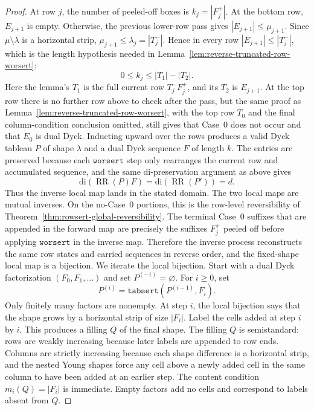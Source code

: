 \documentclass[11pt]{article}
\theoremstyle{plain}
\theoremstyle{definition}
\theoremstyle{remark}
\newcommand{\di}{\mathrm{di}}
\newcommand{\worsert}{\texttt{worsert}}
\begin{document}
\begin{proof}
At row \(j\), the number of peeled-off boxes is \(k_j=|F_j^+|\).  At the bottom
row, \(E_{j+1}\) is empty.  Otherwise, the previous lower-row pass gives
\(|E_{j+1}|\le \mu_{j+1}\).  Since \(\mu\setminus\lambda\) is a horizontal
strip, \(\mu_{j+1}\le \lambda_j=|T_j^-|\).  Hence in every row
\(|E_{j+1}|\le |T_j^-|\), which is the length hypothesis needed in
Lemma~\ref{lem:reverse-truncated-row-worsert}:
\[
  0\le k_j\le |T_1|-|T_2|.
\]
Here the lemma's \(T_1\) is the full current row \(T_j^-F_j^+\), and its
\(T_2\) is \(E_{j+1}\).  At the top row there is no further row above to check
after the pass, but the same proof as
Lemma~\ref{lem:reverse-truncated-row-worsert}, with the top row \(T_0\) and the
final column-condition conclusion omitted, still gives that Case~0 does not
occur and that \(E_0\) is dual Dyck.
Inducting upward over the rows produces a valid Dyck tableau \(P\) of shape
\(\lambda\) and a dual Dyck sequence \(F\) of length \(k\).  The entries are
preserved because each \(\worsert\) step only rearranges the current row and
accumulated sequence, and the same \(\di\)-preservation argument as above gives
\[
  \di(\operatorname{RR}(P)F)=\di(\operatorname{RR}(P'))=d.
\]
Thus the inverse local map lands in the stated domain.
The two local maps are mutual inverses.  On the no-Case~0 portions, this is the
row-level reversibility of Theorem~\ref{thm:rowsert-global-reversibility}.  The
terminal Case~0 suffixes
that are appended in the forward map are precisely the suffixes \(F_j^+\) peeled
off before applying \(\worsert\) in the inverse map.  Therefore the inverse
process reconstructs the same row states and carried sequences in reverse
order, and the fixed-shape local map is a bijection.
We iterate the local bijection.  Start with a dual Dyck factorization
\((F_0,F_1,\ldots)\) and set \(P^{(-1)}=\varnothing\).  For \(i\ge 0\), set
\[
  P^{(i)}=\texttt{tabsert}(P^{(i-1)},F_i).
\]
Only finitely many factors are nonempty.  At step \(i\), the local bijection
says that the shape grows by a horizontal strip of size \(|F_i|\).  Label the
cells added at step \(i\) by \(i\).  This produces a filling \(Q\) of the final
shape.  The filling \(Q\) is semistandard: rows are weakly increasing because
later labels are appended to row ends.  Columns are strictly increasing because
each shape difference is a horizontal strip, and the nested Young shapes force
any cell above a newly added cell in the same column to have been added at an
earlier step.  The content condition \(m_i(Q)=|F_i|\) is immediate.  Empty
factors add no cells and correspond to labels absent from \(Q\).

\end{proof}
\end{document}
